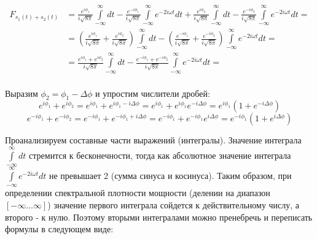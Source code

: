 \documentclass[fleqn,10pt,a4paper]{article}
\begin{document}
\begin{equation*}
	\begin{aligned}
		F_{s_1(t)+s_2(t)} &=
		             \frac{e^{i\phi_1}}{i\sqrt{8\pi}}\int\limits_{-\infty}^\infty dt
		             - \frac{e^{-i\phi_1}}{i\sqrt{8\pi}}\int\limits_{-\infty}^\infty
	                 e^{-2i\omega{}t}dt + 
	                 \frac{e^{i\phi_2}}{i\sqrt{8\pi}}\int\limits_{-\infty}^\infty dt
		             - \frac{e^{-i\phi_2}}{i\sqrt{8\pi}}\int\limits_{-\infty}^\infty
	                 e^{-2i\omega{}t}dt=\\
	                 &=\left(\frac{e^{i\phi_1}}{i\sqrt{8\pi}}+\frac{e^{i\phi_2}}{i\sqrt{8\pi}}\right)
	                 \int\limits_{-\infty}^\infty dt
	                 - \left(\frac{e^{-i\phi_1}}{i\sqrt{8\pi}} +
	                         \frac{e^{-i\phi_2}}{i\sqrt{8\pi}}\right)
	                 \int\limits_{-\infty}^\infty{}e^{-2i\omega{}t}dt=\\
	                 &=\frac{e^{i\phi_1}+e^{i\phi_2}}{i\sqrt{8\pi}}
	                 \int\limits_{-\infty}^\infty dt
	                 - \frac{e^{-i\phi_1}+e^{-i\phi_2}}{i\sqrt{8\pi}}
	                 \int\limits_{-\infty}^\infty{}e^{-2i\omega{}t}dt=\\
	\end{aligned}
\end{equation*}

Выразим $\phi_2=\phi_1-\Delta\phi$ и упростим числители дробей:
\begin{equation*}
	e^{i\phi_1}+e^{i\phi_2}=e^{i\phi_1}+e^{i\phi_1-i\Delta\phi}=e^{i\phi_1}+e^{i\phi_1}e^{-i\Delta\phi}=e^{i\phi_1}\left(1+e^{-i\Delta\phi}\right)
\end{equation*}
\begin{equation*}
	e^{-i\phi_1}+e^{-i\phi_2}=e^{-i\phi_1}+e^{-i\phi_1+i\Delta\phi}=e^{-i\phi_1}+e^{-i\phi_1}e^{i\Delta\phi}=e^{-i\phi_1}\left(1+e^{i\Delta\phi}\right)
\end{equation*}

Проанализируем составные части выражений (интегралы). Значение интеграла
$\int\limits_{-\infty}^\infty dt$ стремится к бесконечности, тогда как
абсолютное значение интеграла $\int\limits_{-\infty}^\infty{}e^{-2i\omega{}t}dt$
не превышает 2 (сумма синуса и косинуса). Таким образом, при определении
спектральной плотности мощности (делении на диапазон $[-\infty\dots{}\infty]$)
значение первого интеграла сойдется к действительному числу, а второго - к нулю.
Поэтому вторыми интегралами можно пренебречь и переписать формулы в следующем
виде:
\end{document}
